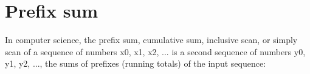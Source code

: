 \section{Prefix sum}
In computer science, the prefix sum, cumulative sum, inclusive scan, or simply scan of a sequence of numbers x0, x1, x2, ... is a second sequence of numbers y0, y1, y2, ..., the sums of prefixes (running totals) of the input sequence: